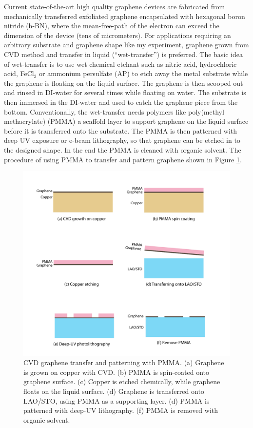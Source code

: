 \documentclass[pdflatex, sectionletters, 12pt]{pittetd}    %
\begin{document}
Current state-of-the-art high quality graphene devices are fabricated from mechanically transferred exfoliated graphene encapsulated with hexagonal boron nitride (h-BN)\cite{dean2010naturenano}, where the mean-free-path of the electron can exceed the dimension of the device\cite{Novoselovaac9439} (tens of micrometers). For applications requiring an arbitrary substrate and graphene shape like my experiment, graphene grown from CVD method and transfer in liquid (``wet-transfer'') is preferred. The basic idea of wet-transfer is to use wet chemical etchant such as nitric acid, hydrochloric acid, FeCl$_3$ or ammonium persulfate (AP) to etch away the metal substrate while the graphene is floating on the liquid surface. The graphene is then scooped out and rinsed in DI-water for several times while floating on water. The substrate is then immersed in the DI-water and used to catch the graphene piece from the bottom. Conventionally, the wet-transfer needs polymers like poly(methyl methacrylate) (PMMA) a scaffold layer to support  graphene on the liquid surface before it is transferred onto the substrate\cite{li2009transfer, reina2008transferring, reina2008large}. The PMMA is then patterned with deep UV exposure or e-beam lithography, so that graphene can be etched in to the designed shape. In the end the PMMA is cleaned with organic solvent. The procedure of using PMMA to transfer and pattern graphene shown in Figure \ref{FIG:PMMATransfer}. 

\begin{figure}[p]
	\centering
	\includegraphics[width=1.0\textwidth]{Drawing/PMMATransfer.pdf}
	\caption{CVD graphene transfer and patterning with PMMA. (a) Graphene is grown on copper with CVD. (b) PMMA is spin-coated onto graphene surface. (c) Copper is etched chemically, while graphene floats on the liquid surface. (d) Graphene is transferred onto LAO/STO, using PMMA as a supporting layer. (d) PMMA is patterned with deep-UV lithography. (f) PMMA is removed with organic solvent.}
	\label{FIG:PMMATransfer}
\end{figure}
\end{document}
